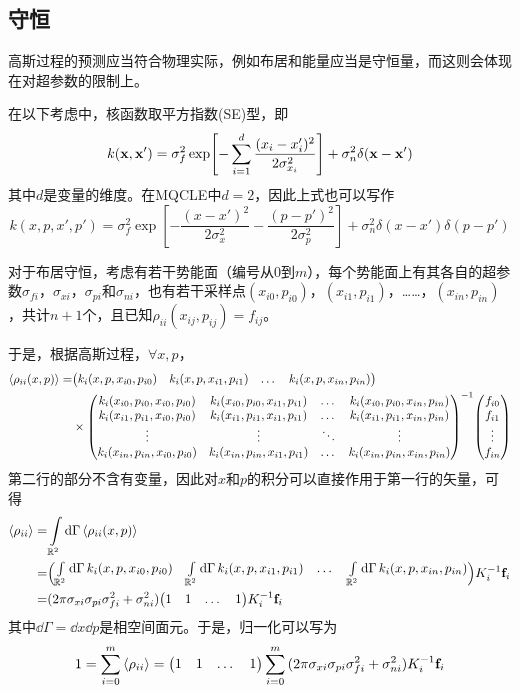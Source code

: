 \documentclass[12pt,UTF8]{article}
\begin{document}
        \subsection{守恒}
			高斯过程的预测应当符合物理实际，例如布居和能量应当是守恒量，而这则会体现在对超参数的限制上。\par
			在以下考虑中，核函数取平方指数(SE)型，即
			\begin{equation}
				k(\vb{x},\vb{x}')=\sigma_f^2\exp[-\sum_{i=1}^d{\frac{(x_i-x'_i)^2}{2\sigma_{x_i}^2}}]+\sigma_n^2\delta(\vb{x}-\vb{x}')
			\end{equation}
			其中$d$是变量的维度。在MQCLE中$d=2$，因此上式也可以写作
			\begin{equation}
				k(x,p,x',p')=\sigma_f^2\exp[-\frac{(x-x')^2}{2\sigma_x^2}-\frac{(p-p')^2}{2\sigma_p^2}]+\sigma_n^2\delta(x-x')\delta(p-p')
			\end{equation}\par
			对于布居守恒，考虑有若干势能面（编号从$0$到$m$），每个势能面上有其各自的超参数$\sigma_{fi}$，$\sigma_{xi}$，$\sigma_{pi}$和$\sigma_{ni}$，也有若干采样点$(x_{i0}, p_{i0})$，$(x_{i1},p_{i1})$，……，$(x_{in},p_{in})$，共计$n+1$个，且已知$\rho_{ii}(x_{ij},p_{ij})=f_{ij}$。\par
			于是，根据高斯过程，$\forall x,p$，
			\begin{align}
				\ev{\rho_{ii}(x,p)}=&\mqty(k_i(x,p,x_{i0},p_{i0}) & k_i(x,p,x_{i1},p_{i1}) & \dots & k_i(x,p,x_{in},p_{in})) \nonumber \\
				&\times\mqty(k_i(x_{i0},p_{i0},x_{i0},p_{i0}) & k_i(x_{i0},p_{i0},x_{i1},p_{i1}) & \dots & k_i(x_{i0},p_{i0},x_{in},p_{in}) \\
				k_i(x_{i1},p_{i1},x_{i0},p_{i0}) & k_i(x_{i1},p_{i1},x_{i1},p_{i1}) & \dots & k_i(x_{i1},p_{i1},x_{in},p_{in}) \\
				\vdots & \vdots & \ddots & \vdots \\
				k_i(x_{in},p_{in},x_{i0},p_{i0}) & k_i(x_{in},p_{in},x_{i1},p_{i1}) & \dots & k_i(x_{in},p_{in},x_{in},p_{in}))^{-1}\mqty(f_{i0} \\ f_{i1} \\ \vdots \\ f_{in})
			\end{align}
			第二行的部分不含有变量，因此对$x$和$p$的积分可以直接作用于第一行的矢量，可得
			\begin{align}
				\ev{\rho_{ii}}=&\int\limits_{\mathbb{R}^2}{\dd{\Gamma}\ev{\rho_{ii}(x,p)}} \\
				=&\mqty(\int\limits_{\mathbb{R}^2}{\dd{\Gamma}k_i(x,p,x_{i0},p_{i0})} & \int\limits_{\mathbb{R}^2}{\dd{\Gamma}k_i(x,p,x_{i1},p_{i1})} & \dots & \int\limits_{\mathbb{R}^2}{\dd{\Gamma}k_i(x,p,x_{in},p_{in})})K_i^{-1}\vb{f}_i \\
				=&(2\pi\sigma_{xi}\sigma_{pi}\sigma_{fi}^2+\sigma_{ni}^2)\mqty(1 & 1 & \dots & 1)K_i^{-1}\vb{f}_i
			\end{align}
			其中$\dd{\Gamma}=\dd{x}\dd{p}$是相空间面元。于是，归一化可以写为
			\begin{equation}
				1=\sum_{i=0}^m{\ev{\rho_{ii}}}=\mqty(1 & 1 & \dots & 1)\sum_{i=0}^m{(2\pi\sigma_{xi}\sigma_{pi}\sigma_{fi}^2+\sigma_{ni}^2)K_i^{-1}\vb{f}_i}
			\end{equation}
\end{document}
